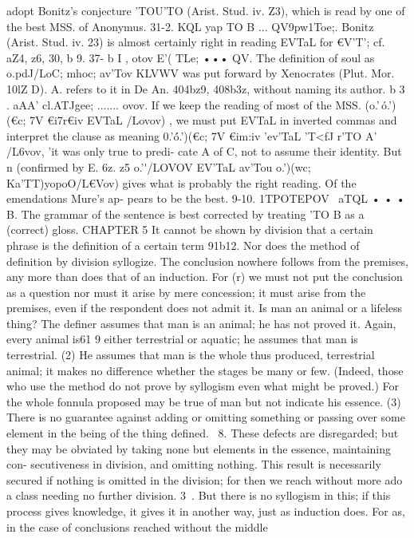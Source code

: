 {{{{{{{{{{{{{{{{{{{{{{{{{adopt Bonitz's conjecture 'TOU'TO (Arist. Stud. iv. Z3), which is
read by one of the best MSS. of Anonymus.
31-2. KQL yap TO B ... QV9pw1Toe;. Bonitz (Arist. Stud. iv. 23)
is almost certainly right in reading EVTaL for €V'T'; cf. aZ4, z6, 30, b 9.
37- b I , otov E'( TLe; ••• QV. The definition of soul as o.pdJ/LoC;
mhoc; av'Tov KLVWV was put forward by Xenocrates (Plut. Mor.
10lZ D). A. refers to it in De An. 404bz9, 408b3z, without naming
its author.
b 3 . aAA' cl.ATJgee; ....... ovov. If we keep the reading of most of
the MSS. (o.'\,\' o.'\T)(}€c; 7}V €i7r€iv EVTaL /Lovov) , we must put EVTaL
in inverted commas and interpret the clause as meaning 0.'\'\'
o.'\T)(}€c; 7}V €im:iv 'ev'TaL 'T<fJ r'TO A' /L6vov, 'it was only true to predi-
cate A of C, not to assume their identity. But n (confirmed by
E. 6z. z5 o.'\'\a /LOVOV EV'TaL av'Tou o.'\T)(}wc; Ka'TT)yopoO/L€Vov) gives what
is probably the right reading. Of the emendations Mure's ap-
pears to be the best.
9-10. 1TPOTEPOV ~aTQL • • • B. The grammar of the sentence
is best corrected by treating 'TO B as a (correct) gloss.
CHAPTER 5
It cannot be shown by division that a certain phrase is the
definition of a certain term
91b12. Nor does the method of definition by division syllogize.
The conclusion nowhere follows from the premises, any more than
does that of an induction. For (r) we must not put the conclusion
as a question nor must it arise by mere concession; it must arise
from the premises, even if the respondent does not admit it.
Is man an animal or a lifeless thing? The definer assumes that
man is an animal; he has not proved it. Again, every animal is61 9
either terrestrial or aquatic; he assumes that man is terrestrial.
(2) He assumes that man is the whole thus produced, terrestrial
animal; it makes no difference whether the stages be many or
few. (Indeed, those who use the method do not prove by
syllogism even what might be proved.) For the whole fonnula
proposed may be true of man but not indicate his essence. (3)
There is no guarantee against adding or omitting something or
passing over some element in the being of the thing defined.
~8. These defects are disregarded; but they may be obviated
by taking none but elements in the essence, maintaining con-
secutiveness in division, and omitting nothing. This result is
necessarily secured if nothing is omitted in the division; for then
we reach without more ado a class needing no further division.
3~. But there is no syllogism in this; if this process gives
knowledge, it gives it in another way, just as induction does.
For as, in the case of conclusions reached without the middle
}}}}}}}}}}}}}}}}}}}}
